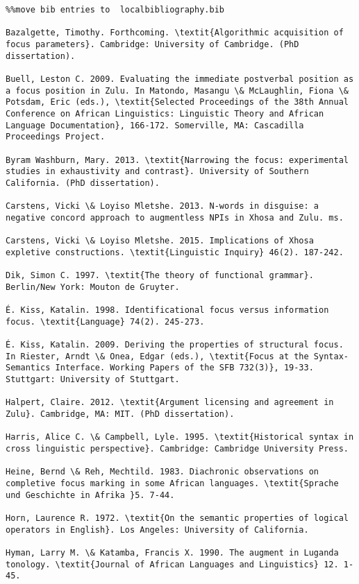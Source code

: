 \documentclass[output=paper]{langsci/langscibook}
\begin{document}
\begin{verbatim}%%move bib entries to  localbibliography.bib

Bazalgette, Timothy. Forthcoming. \textit{Algorithmic acquisition of focus parameters}. Cambridge: University of Cambridge. (PhD dissertation).

Buell, Leston C. 2009. Evaluating the immediate postverbal position as a focus position in Zulu. In Matondo, Masangu \& McLaughlin, Fiona \& Potsdam, Eric (eds.), \textit{Selected Proceedings of the 38th Annual Conference on African Linguistics: Linguistic Theory and African Language Documentation}, 166-172. Somerville, MA: Cascadilla Proceedings Project.

Byram Washburn, Mary. 2013. \textit{Narrowing the focus: experimental studies in exhaustivity and contrast}. University of Southern California. (PhD dissertation).

Carstens, Vicki \& Loyiso Mletshe. 2013. N-words in disguise: a negative concord approach to augmentless NPIs in Xhosa and Zulu. ms.

Carstens, Vicki \& Loyiso Mletshe. 2015. Implications of Xhosa expletive constructions. \textit{Linguistic Inquiry} 46(2). 187-242.

Dik, Simon C. 1997. \textit{The theory of functional grammar}. Berlin/New York: Mouton de Gruyter.

É. Kiss, Katalin. 1998. Identificational focus versus information focus. \textit{Language} 74(2). 245-273.

É. Kiss, Katalin. 2009. Deriving the properties of structural focus. In Riester, Arndt \& Onea, Edgar (eds.), \textit{Focus at the Syntax-Semantics Interface. Working Papers of the SFB 732(3)}, 19-33. Stuttgart: University of Stuttgart.

Halpert, Claire. 2012. \textit{Argument licensing and agreement in Zulu}. Cambridge, MA: MIT. (PhD dissertation).

Harris, Alice C. \& Campbell, Lyle. 1995. \textit{Historical syntax in cross linguistic perspective}. Cambridge: Cambridge University Press.

Heine, Bernd \& Reh, Mechtild. 1983. Diachronic observations on completive focus marking in some African languages. \textit{Sprache und Geschichte in Afrika }5. 7-44.

Horn, Laurence R. 1972. \textit{On the semantic properties of logical operators in English}. Los Angeles: University of California.

Hyman, Larry M. \& Katamba, Francis X. 1990. The augment in Luganda tonology. \textit{Journal of African Languages and Linguistics} 12. 1-45.


\end{verbatim}
\end{document}
